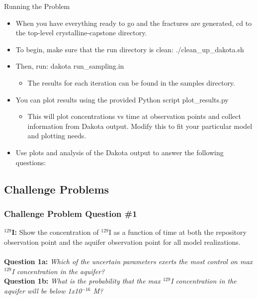 \documentclass{beamer}
\begin{document}
\begin{frame}[fragile]{Running the Problem}
	
	\begin{itemize}
                \item When you have everything ready to go and the fractures are generated, cd to the top-level crystalline-capstone directory.
                \item To begin, make sure that the run directory is clean: ./clean\_up\_dakota.sh
		\item Then, run: dakota run\_sampling.in
                \begin{itemize}
                  \item The results for each iteration can be found in the samples directory.
                \end{itemize}
		\item You can plot results using the provided Python script plot\_results.py
                \begin{itemize}
                  \item This will plot concentrations vs time at observation points and collect information from Dakota output. Modify this to fit your particular model and plotting needs.
                \end{itemize}
		\item Use plots and analysis of the Dakota output to answer the following questions:
	\end{itemize}
	
\end{frame}



\subsection{Challenge Problems}

\begin{frame}[fragile]\frametitle{Challenge Problem Question \#1}
	\textbf{$^{129}$I:} Show the concentration of $^{129}$I as a function of time at both the repository observation point and the aquifer observation point for all model realizations.  \\
	\textbf{    }\\
	\textbf{Question 1a: }\textit{Which of the uncertain parameters exerts the most control on max $^{129}$I concentration in the aquifer?}
	\textbf{    }\\
	\textbf{Question 1b: }\textit{What is the probability that the max $^{129}$I concentration in the aquifer will be below 1x10$^{-16}$ M?}
\end{frame}
\end{document}
